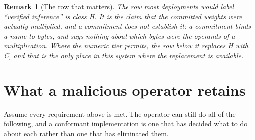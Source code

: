 \documentclass[11pt,a4paper]{article}
\newtheorem{remark}[definition]{Remark}
\begin{document}
\begin{remark}[The row that matters]
The row most deployments would label ``verified inference'' is class H. It is the
claim that the committed weights were actually multiplied, and a commitment does not
establish it: a commitment binds a name to bytes, and says nothing about which bytes
were the operands of a multiplication. Where the numeric tier permits, the row below
it replaces H with C, and that is the only place in this system where the
replacement is available.
\end{remark}

\section{What a malicious operator retains}
\label{sec:residual}

Assume every requirement above is met. The operator can still do all of the
following, and a conformant implementation is one that has decided what to do about
each rather than one that has eliminated them.
\end{document}

